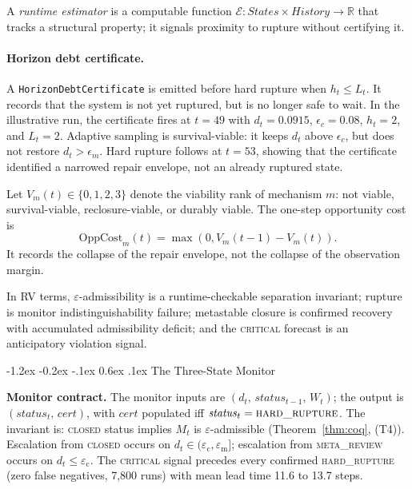 \documentclass{llncs}
\makeatletter
\renewcommand\section{\@startsection{section}{1}{\z@}%
  {-1.2ex \@plus -0.2ex \@minus -.1ex}%
  {0.6ex \@plus .1ex}%
  {\normalfont\large\bfseries}}
\newcommand{\ecollapse}{\varepsilon_{\mathrm{c}}}
\newcommand{\emeta}{\varepsilon_{\mathrm{m}}}
\newcommand{\st}[1]{\textup{\textsc{#1}}}
\makeatother
\begin{document}
\begin{definition}
\label{def:estimator}
A \emph{runtime estimator} is a computable function
$\mathcal{E} : \mathit{States} \times \mathit{History} \to \mathbb{R}$
that tracks a structural property; it signals proximity to rupture
without certifying it.
\end{definition}

\paragraph{Horizon debt certificate.}
A \texttt{HorizonDebtCertificate} is emitted before hard rupture when \(h_t\leq L_t\). It records that the system is not yet ruptured, but is no longer safe to wait. In the illustrative run, the certificate fires at \(t=49\) with \(d_t=0.0915\), \(\epsilon_c=0.08\), \(h_t=2\), and \(L_t=2\). Adaptive sampling is survival-viable: it keeps \(d_t\) above \(\epsilon_c\), but does not restore \(d_t>\epsilon_m\). Hard rupture follows at \(t=53\), showing that the certificate identified a narrowed repair envelope, not an already ruptured state.

Let \(V_m(t)\in\{0,1,2,3\}\) denote the viability rank of mechanism \(m\): not viable, survival-viable, reclosure-viable, or durably viable. The one-step opportunity cost is
\[
\mathrm{OppCost}_m(t)=\max(0,V_m(t-1)-V_m(t)).
\]
It records the collapse of the repair envelope, not the collapse of the observation margin.

In RV terms, $\varepsilon$-admissibility is a runtime-checkable
separation invariant; rupture is monitor indistinguishability failure;
metastable closure is confirmed recovery with accumulated admissibility
deficit; and the \st{critical} forecast is an anticipatory violation signal.

\section{The Three-State Monitor}
\label{sec:monitor}

{\sloppy\noindent\textbf{Monitor contract.}
The monitor inputs are $(d_t,\allowbreak\, \mathit{status}_{t-1},\allowbreak\, W_t)$;
the output is $(\mathit{status}_t,\, \mathit{cert})$, with
$\mathit{cert}$ populated iff $\mathit{status}_t = \st{hard\_rupture}$.
The invariant is: \st{closed} status implies $M_t$ is
$\varepsilon$-admissible (Theorem~\ref{thm:coq}, (T4)). Escalation from
\st{closed} occurs on $d_t \in (\ecollapse, \emeta]$; escalation from
\st{meta\_review} occurs on $d_t \leq \ecollapse$. The \st{critical}
signal precedes every confirmed \st{hard\_rupture} (zero false negatives,
7,800 runs) with mean lead time 11.6 to 13.7 steps.\par}
\end{document}
